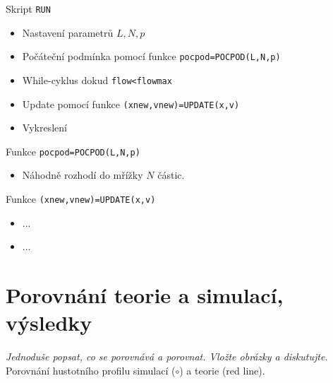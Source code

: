 \documentclass[a4paper, 12pt, fleqn]{article}
\begin{document}
\noindent Skript \verb+RUN+
\begin{itemize}
	\item Nastavení parametrů $L,N,p$
	\item Počáteční podmínka pomocí funkce \verb+pocpod=POCPOD(L,N,p)+
	\item While-cyklus dokud \verb+flow<flowmax+
	\item Update pomocí funkce \verb+(xnew,vnew)=UPDATE(x,v)+
	\item Vykreslení
\end{itemize}

\noindent Funkce \verb+pocpod=POCPOD(L,N,p)+
\begin{itemize}
	\item Náhodně rozhodí do mřížky $N$ částic.
\end{itemize}

\noindent Funkce \verb+(xnew,vnew)=UPDATE(x,v)+
\begin{itemize}
	\item ...
	\item ...
\end{itemize}

\section*{Porovnání teorie a simulací, výsledky}
\emph{Jednoduše popsat, co se porovnává a porovnat. Vložte obrázky a diskutujte.}\\

Porovnání hustotního profilu simulací ($\circ$) a teorie (red line).

\begin{center}
\end{center}
\end{document}
